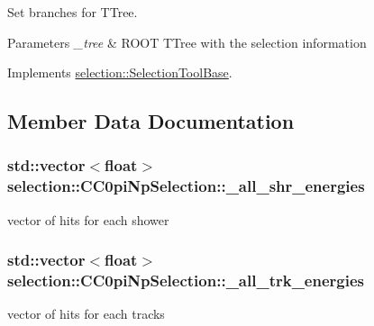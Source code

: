 Set branches for T\+Tree. 


\begin{DoxyParams}{Parameters}
{\em \+\_\+tree} & R\+O\+OT T\+Tree with the selection information \\
\hline
\end{DoxyParams}


Implements \hyperlink{classselection_1_1SelectionToolBase_aa97ea5e55391240d8e251dae13897996}{selection\+::\+Selection\+Tool\+Base}.



\subsection{Member Data Documentation}
\subsubsection[{\texorpdfstring{\+\_\+all\+\_\+shr\+\_\+energies}{_all_shr_energies}}]{\setlength{\rightskip}{0pt plus 5cm}std\+::vector$<$float$>$ selection\+::\+C\+C0pi\+Np\+Selection\+::\+\_\+all\+\_\+shr\+\_\+energies\hspace{0.3cm}{\ttfamily [private]}}\hypertarget{classselection_1_1CC0piNpSelection_a0397406f8ed009ad17e2759168c21163}{}\label{classselection_1_1CC0piNpSelection_a0397406f8ed009ad17e2759168c21163}
vector of hits for each shower 
\subsubsection[{\texorpdfstring{\+\_\+all\+\_\+trk\+\_\+energies}{_all_trk_energies}}]{\setlength{\rightskip}{0pt plus 5cm}std\+::vector$<$float$>$ selection\+::\+C\+C0pi\+Np\+Selection\+::\+\_\+all\+\_\+trk\+\_\+energies\hspace{0.3cm}{\ttfamily [private]}}\hypertarget{classselection_1_1CC0piNpSelection_af7caaefffdb29a2e1faa921507f0f253}{}\label{classselection_1_1CC0piNpSelection_af7caaefffdb29a2e1faa921507f0f253}
vector of hits for each tracks 
